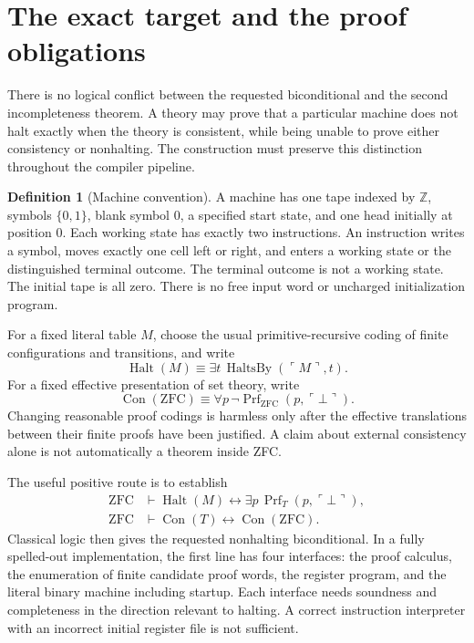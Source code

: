 \documentclass[11pt,a4paper]{article}
\theoremstyle{definition}
\newtheorem{definition}[theorem]{Definition}
\newcommand{\ZFC}{\mathrm{ZFC}}
\newcommand{\Con}{\operatorname{Con}}
\newcommand{\Halt}{\operatorname{Halt}}
\begin{document}
\section{The exact target and the proof obligations}
\label{sec:target}

There is no logical conflict between the requested biconditional and the
second incompleteness theorem.  A theory may prove that a particular machine
does not halt exactly when the theory is consistent, while being unable to
prove either consistency or nonhalting.  The construction must preserve this
distinction throughout the compiler pipeline.

\begin{definition}[Machine convention]
A machine has one tape indexed by $\mathbb Z$, symbols $\{0,1\}$, blank symbol
$0$, a specified start state, and one head initially at position $0$.
Each working state has exactly two instructions.  An instruction writes a
symbol, moves exactly one cell left or right, and enters a working state or
the distinguished terminal outcome.  The terminal outcome is not a working
state.  The initial tape is all zero.  There is no free input word or uncharged
initialization program.
\end{definition}

For a fixed literal table $M$, choose the usual primitive-recursive coding
of finite configurations and transitions, and write
\[
 \Halt(M)\equiv\exists t\,\operatorname{HaltsBy}(\ulcorner M\urcorner,t).
\]
For a fixed effective presentation of set theory, write
\[
 \Con(\ZFC)\equiv
 \forall p\,\neg\operatorname{Prf}_{\ZFC}(p,\ulcorner\bot\urcorner).
\]
Changing reasonable proof codings is harmless only after the effective
translations between their finite proofs have been justified.  A claim about
external consistency alone is not automatically a theorem inside ZFC.

The useful positive route is to establish
\begin{align}
 \ZFC&\vdash \Halt(M)\leftrightarrow
       \exists p\,\operatorname{Prf}_{T}(p,\ulcorner\bot\urcorner),
       \label{eq:machine-calibration}\\
 \ZFC&\vdash \Con(T)\leftrightarrow\Con(\ZFC).
       \label{eq:theory-calibration}
\end{align}
Classical logic then gives the requested nonhalting biconditional.  In a
fully spelled-out implementation, the first line has four interfaces:
the proof calculus, the enumeration of finite candidate proof words, the
register program, and the literal binary machine including startup.
Each interface needs soundness and completeness in the direction relevant
to halting.  A correct instruction interpreter with an incorrect initial
register file is not sufficient.
\end{document}
